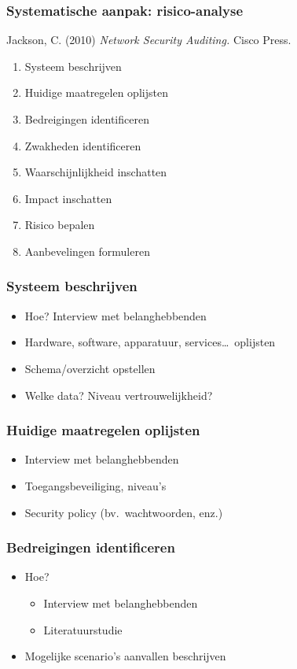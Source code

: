 \documentclass[aspectratio=169]{beamer}
\begin{document}
\begin{frame}
  \frametitle{Systematische aanpak: risico-analyse}

  Jackson, C. (2010) \textit{Network Security Auditing.} Cisco Press.

  \begin{enumerate}
    \item Systeem beschrijven
    \item Huidige maatregelen oplijsten
    \item Bedreigingen identificeren
    \item Zwakheden identificeren
    \item Waarschijnlijkheid inschatten
    \item Impact inschatten
    \item Risico bepalen
    \item Aanbevelingen formuleren
  \end{enumerate}

\end{frame}

\begin{frame}
  \frametitle{Systeem beschrijven}

  \begin{itemize}
    \item Hoe? Interview met belanghebbenden
    \item Hardware, software, apparatuur, services\ldots~oplijsten
    \item Schema/overzicht opstellen
    \item Welke data? Niveau vertrouwelijkheid?
  \end{itemize}

\end{frame}

\begin{frame}
  \frametitle{Huidige maatregelen oplijsten}

  \begin{itemize}
    \item Interview met belanghebbenden
    \item Toegangsbeveiliging, niveau's
    \item Security policy (bv.\ wachtwoorden, enz.)
  \end{itemize}

\end{frame}

\begin{frame}
  \frametitle{Bedreigingen identificeren}

  \begin{itemize}
    \item Hoe?
          \begin{itemize}
            \item Interview met belanghebbenden
            \item Literatuurstudie
          \end{itemize}
    \item Mogelijke scenario's aanvallen beschrijven
  \end{itemize}

\end{frame}
\end{document}
